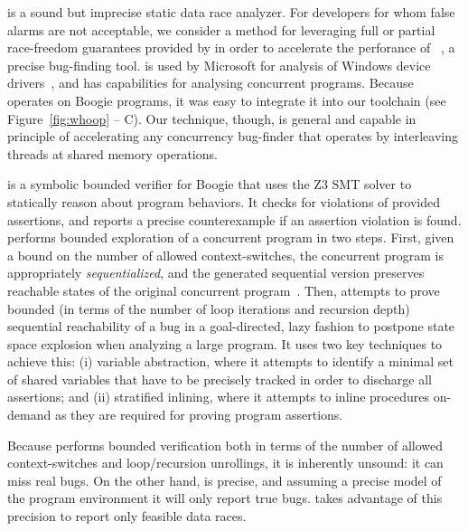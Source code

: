 
\whoop is a sound but imprecise static data race analyzer.
For developers for whom false alarms are not acceptable, we consider a method for leveraging full or partial
race-freedom guarantees provided by \whoop in order to accelerate the perforance of 
\corral~\cite{lal2012corral}, a precise bug-finding tool.
\corral is used by Microsoft for analysis of Windows device drivers~\cite{lal2014powering},
and has capabilities for analysing concurrent programs.  Because \corral operates on Boogie programs,
it was easy to integrate it into our toolchain (see Figure~\ref{fig:whoop} -- C).
Our technique, though, is general and capable in principle of accelerating any concurrency bug-finder that operates
by interleaving threads at shared memory operations.

\corral is a symbolic bounded verifier for Boogie that uses the Z3 SMT solver to statically reason about program behaviors. It checks for violations of provided assertions, and reports a precise counterexample if an assertion violation is found. \corral performs bounded exploration of a concurrent program in two steps. First, given a bound on the number of allowed context-switches, the concurrent program is appropriately \emph{sequentialized}, and the generated sequential version preserves reachable states of the original concurrent program~\cite{popl2011-eqr,cav2009-lqr,cavLalR08}. Then, \corral attempts to prove bounded (in terms of the number of loop iterations and recursion depth) sequential reachability of a bug in a goal-directed, lazy fashion to postpone state space explosion when analyzing a large program. It uses two key techniques to achieve this: (i) variable abstraction, where it attempts to identify a minimal set of shared variables that have to be precisely tracked in order to discharge all assertions; and (ii) stratified inlining, where it attempts to inline procedures on-demand as they are required for proving program assertions.

Because \corral performs bounded verification both in terms of the number of allowed context-switches and loop/recursion unrollings, it is inherently unsound: it can miss real bugs. On the other hand, \corral is precise, and assuming a precise model of the program environment it will only report true bugs. \whoop takes advantage of this precision to report only feasible data races.


